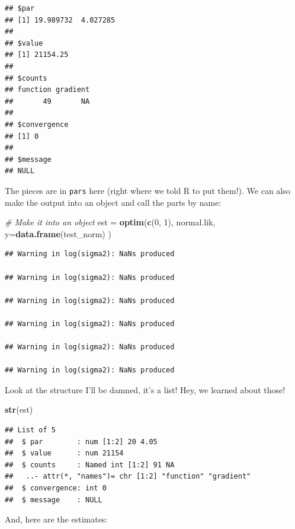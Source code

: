 \documentclass[
]{book}
\newenvironment{Shaded}{\begin{snugshade}}{\end{snugshade}}
\newcommand{\CommentTok}[1]{\textcolor[rgb]{0.56,0.35,0.01}{\textit{#1}}}
\newcommand{\DataTypeTok}[1]{\textcolor[rgb]{0.13,0.29,0.53}{#1}}
\newcommand{\DecValTok}[1]{\textcolor[rgb]{0.00,0.00,0.81}{#1}}
\newcommand{\KeywordTok}[1]{\textcolor[rgb]{0.13,0.29,0.53}{\textbf{#1}}}
\newcommand{\NormalTok}[1]{#1}
\newcommand{\OperatorTok}[1]{\textcolor[rgb]{0.81,0.36,0.00}{\textbf{#1}}}
\newcommand{\StringTok}[1]{\textcolor[rgb]{0.31,0.60,0.02}{#1}}
\begin{document}
\begin{verbatim}
## $par
## [1] 19.989732  4.027285
## 
## $value
## [1] 21154.25
## 
## $counts
## function gradient 
##       49       NA 
## 
## $convergence
## [1] 0
## 
## $message
## NULL
\end{verbatim}

The pieces are in \texttt{pars} here (right where we told R to put them!). We can also make the output into an object and call the parts by name:

\begin{Shaded}
\begin{Highlighting}[]
\CommentTok{# Make it into an object}
\NormalTok{est =}\StringTok{ }\KeywordTok{optim}\NormalTok{(}\KeywordTok{c}\NormalTok{(}\DecValTok{0}\NormalTok{, }\DecValTok{1}\NormalTok{),}
\NormalTok{            normal.lik,}
            \DataTypeTok{y=}\KeywordTok{data.frame}\NormalTok{(test_norm)}
\NormalTok{            ) }
\end{Highlighting}
\end{Shaded}

\begin{verbatim}
## Warning in log(sigma2): NaNs produced

## Warning in log(sigma2): NaNs produced

## Warning in log(sigma2): NaNs produced

## Warning in log(sigma2): NaNs produced

## Warning in log(sigma2): NaNs produced

## Warning in log(sigma2): NaNs produced
\end{verbatim}

Look at the structure I'll be damned, it's a list! Hey, we learned about those!

\begin{Shaded}
\begin{Highlighting}[]
\KeywordTok{str}\NormalTok{(est)   }
\end{Highlighting}
\end{Shaded}

\begin{verbatim}
## List of 5
##  $ par        : num [1:2] 20 4.05
##  $ value      : num 21154
##  $ counts     : Named int [1:2] 91 NA
##   ..- attr(*, "names")= chr [1:2] "function" "gradient"
##  $ convergence: int 0
##  $ message    : NULL
\end{verbatim}

And, here are the estimates:

\begin{Shaded}
\end{Shaded}
\end{document}
